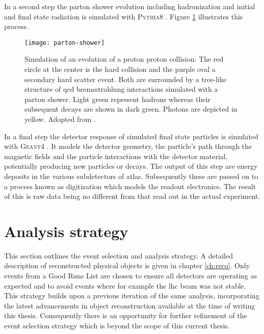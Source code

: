 In a second step the parton shower evolution including hadronization and initial and final state radiation is simulated with \textsc{Pythia8} \citep{Sjostrand:2014zea}. Figure \ref{fig:parton_shower} illustrates this process.
\begin{figure}[]
    \centering
    \texttt{[image: parton-shower]}
    \caption{Simulation of an evolution of a proton proton collision: The red circle at the center is the hard collision and the purple oval a secondary hard scatter event. Both are surrounded by a tree-like structure of \ac{qcd} bremsstrahlung interactions simulated with a parton shower. Light green represent hadrons whereas their subsequent decays are shown in dark green. Photons are depicted in yellow. Adopted from \citep{Hoche:2014rga}.
        \label{fig:parton_shower}}
\end{figure}

In a final step the detector response of simulated final state particles is simulated with \textsc{Geant}4 \citep{Agostinelli:2002hh}. It models the detector geometry, the particle's path through the magnetic fields and the particle interactions with the detector material, potentially producing new particles or decays. The output of this step are energy deposits in the various subdetectors of \ac{atlas}. Subsequently these are passed on to a process known as digitization which models the readout electronics. The result of this is raw data being no different from that read out in the actual experiment.

\section{Analysis strategy}\label{hh4b_analysis_strategy}
This section outlines the event selection and analysis strategy. A detailed description of reconstructed physical objects is given in chapter \ref{ch:reco}. Only events from a Good Runs List are chosen to ensure all detectors are operating as expected and to avoid events where for example the \ac{lhc} beam was not stable. This strategy builds upon a previous iteration of the same analysis, incorporating the latest advancements in object reconstruction available at the time of writing this thesis. Consequently there is an opportunity for further refinement of the event selection strategy which is beyond the scope of this current thesis.

